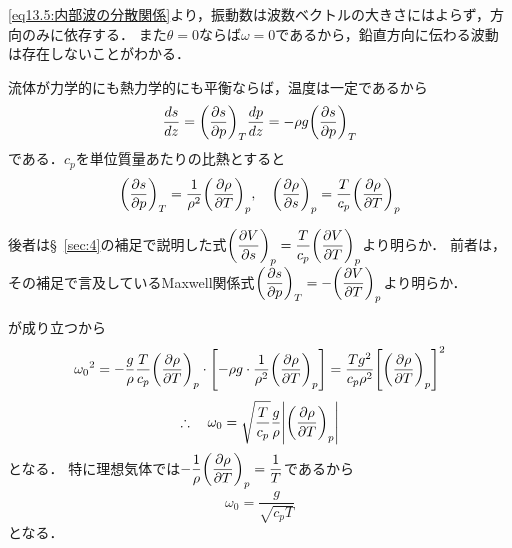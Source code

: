 \eqref{eq13.5:内部波の分散関係}より，振動数は波数ベクトルの大きさにはよらず，方向のみに依存する．
また$\theta=0$ならば$\omega=0$であるから，鉛直方向に伝わる波動は存在しないことがわかる．



流体が力学的にも熱力学的にも平衡ならば，温度は一定であるから
\[
    \dv{s}{z} = \PDV{s}{p}{T} \dv{p}{z} = -\rho g \PDV{s}{p}{T}
\]
である．$c_p$を単位質量あたりの比熱とすると
\[
    \PDV{s}{p}{T} = \frac{1}{\rho^2} \PDV{\rho}{T}{p}, \quad
    \PDV{\rho}{s}{p} = \frac{T}{c_p} \PDV{\rho}{T}{p}
\]
\begin{details}
後者は\S~\ref{sec:4}の補足で説明した式$\dPDV{V}{s}{p} = \dfrac{T}{c_p} \dPDV{V}{T}{p}$より明らか．
前者は，その補足で言及しているMaxwell関係式$\dPDV{s}{p}{T} = - \dPDV{V}{T}{p}$より明らか．
\end{details}
\noindent
が成り立つから
\[
    {\omega_0}^2 = - \frac{g}{\rho} \frac{T}{c_p} \PDV{\rho}{T}{p} \cdot \bqty{ -\rho g \cdot \frac{1}{\rho^2} \PDV{\rho}{T}{p} }
    = \frac{Tg^2}{c_p \rho^2} \bqty{\PDV{\rho}{T}{p}}^2
\]
\begin{equation}
    \yueni \omega_0 = \sqrt{\frac{T}{c_p}} \frac{g}{\rho} \vqty{\PDV{\rho}{T}{p}}
\end{equation}
となる．
特に理想気体では$-\dfrac{1}{\rho} \dPDV{\rho}{T}{p} = \dfrac{1}{T}$であるから
\begin{equation}
    \omega_0 =   \frac{g}{\sqrt{c_pT}} 
\end{equation}
となる．

